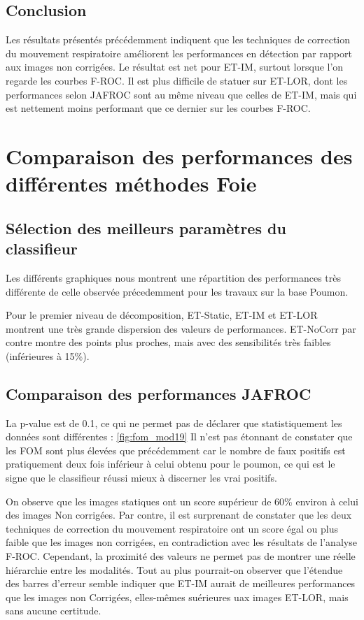 \subsection{Conclusion}

Les résultats présentés précédemment indiquent que les techniques de correction du mouvement respiratoire améliorent les performances en détection par rapport aux images non corrigées. Le résultat est net pour ET-IM, surtout lorsque l'on regarde les courbes F-ROC. Il est plus difficile de statuer sur ET-LOR, dont les performances selon JAFROC sont au même niveau que celles de ET-IM, mais qui est nettement moins performant que ce dernier sur les courbes F-ROC.


\FloatBarrier

\section{Comparaison des performances des différentes méthodes Foie}


\subsection{Sélection des meilleurs paramètres du classifieur}

Les différents graphiques nous montrent une répartition des performances très différente de celle observée précedemment pour les travaux sur la base Poumon. 

Pour le premier niveau de décomposition, ET-Static, ET-IM et ET-LOR montrent une très grande dispersion des valeurs de performances. ET-NoCorr par contre montre des points plus proches, mais avec des sensibilités très faibles (inférieures à 15\%).

\subsection{Comparaison des performances JAFROC}

La p-value est de 0.1, ce qui ne permet pas de déclarer que statistiquement les données sont différentes : \ref{fig:fom_mod19}
Il n'est pas étonnant de constater que les FOM sont plus élevées que précédemment car le nombre de faux positifs est pratiquement deux fois inférieur à celui obtenu pour le poumon, ce qui est le signe que le classifieur réussi mieux à discerner les vrai positifs.

On observe que les images statiques ont un score supérieur de 60\% environ à celui des images Non corrigées. Par contre, il est surprenant de constater que les deux techniques de correction du mouvement respiratoire ont un score égal ou plus faible que les images non corrigées, en contradiction avec les résultats de l'analyse F-ROC. Cependant, la proximité des valeurs ne permet pas de montrer une réelle hiérarchie entre les modalités. Tout au plus pourrait-on observer que l'étendue des barres d'erreur semble indiquer que ET-IM aurait de meilleures performances que les images non Corrigées, elles-mêmes suérieures uax images ET-LOR, mais sans aucune certitude.

